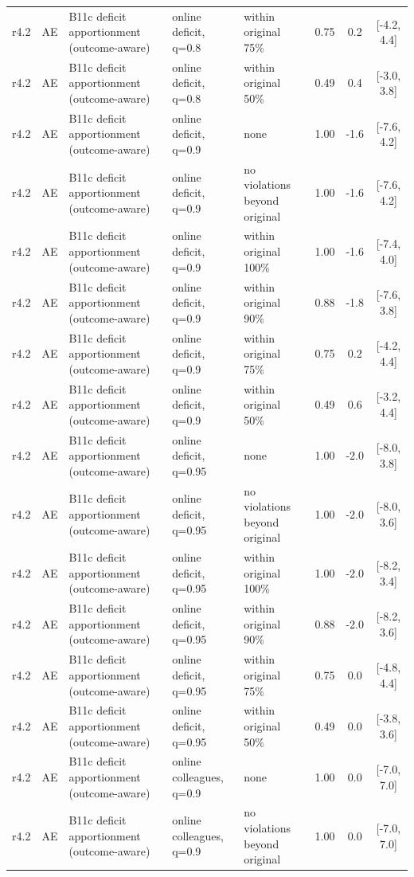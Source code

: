 \begin{longtable}{lllp{4.2cm}p{3.4cm}ccc}
r4.2 & AE & B11c deficit apportionment (outcome-aware) & online deficit, q=0.8 & within original 75\% & 0.75 & 0.2 & [-4.2, 4.4] \\
r4.2 & AE & B11c deficit apportionment (outcome-aware) & online deficit, q=0.8 & within original 50\% & 0.49 & 0.4 & [-3.0, 3.8] \\
r4.2 & AE & B11c deficit apportionment (outcome-aware) & online deficit, q=0.9 & none & 1.00 & -1.6 & [-7.6, 4.2] \\
r4.2 & AE & B11c deficit apportionment (outcome-aware) & online deficit, q=0.9 & no violations beyond original & 1.00 & -1.6 & [-7.6, 4.2] \\
r4.2 & AE & B11c deficit apportionment (outcome-aware) & online deficit, q=0.9 & within original 100\% & 1.00 & -1.6 & [-7.4, 4.0] \\
r4.2 & AE & B11c deficit apportionment (outcome-aware) & online deficit, q=0.9 & within original 90\% & 0.88 & -1.8 & [-7.6, 3.8] \\
r4.2 & AE & B11c deficit apportionment (outcome-aware) & online deficit, q=0.9 & within original 75\% & 0.75 & 0.2 & [-4.2, 4.4] \\
r4.2 & AE & B11c deficit apportionment (outcome-aware) & online deficit, q=0.9 & within original 50\% & 0.49 & 0.6 & [-3.2, 4.4] \\
r4.2 & AE & B11c deficit apportionment (outcome-aware) & online deficit, q=0.95 & none & 1.00 & -2.0 & [-8.0, 3.8] \\
r4.2 & AE & B11c deficit apportionment (outcome-aware) & online deficit, q=0.95 & no violations beyond original & 1.00 & -2.0 & [-8.0, 3.6] \\
r4.2 & AE & B11c deficit apportionment (outcome-aware) & online deficit, q=0.95 & within original 100\% & 1.00 & -2.0 & [-8.2, 3.4] \\
r4.2 & AE & B11c deficit apportionment (outcome-aware) & online deficit, q=0.95 & within original 90\% & 0.88 & -2.0 & [-8.2, 3.6] \\
r4.2 & AE & B11c deficit apportionment (outcome-aware) & online deficit, q=0.95 & within original 75\% & 0.75 & 0.0 & [-4.8, 4.4] \\
r4.2 & AE & B11c deficit apportionment (outcome-aware) & online deficit, q=0.95 & within original 50\% & 0.49 & 0.0 & [-3.8, 3.6] \\
r4.2 & AE & B11c deficit apportionment (outcome-aware) & online colleagues, q=0.9 & none & 1.00 & 0.0 & [-7.0, 7.0] \\
r4.2 & AE & B11c deficit apportionment (outcome-aware) & online colleagues, q=0.9 & no violations beyond original & 1.00 & 0.0 & [-7.0, 7.0] \\

\end{longtable}
